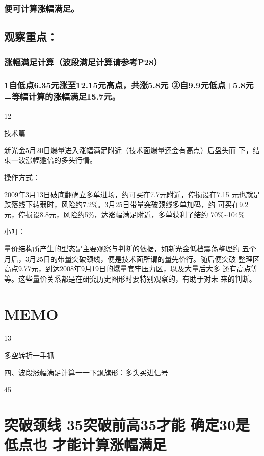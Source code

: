 \documentclass{article}
\begin{document}
\subsubsection{便可计算涨幅满足。}

\subsection{观察重点：}

\subsubsection{涨幅满足计算（波段满足计算请参考P28）}

\subsubsection{1自低点6.35元涨至12.15元高点，共涨5.8元 ②自9.9元低点+5.8元=等幅计算的涨幅满足15.7元。}

12

\clearpage

技术篇

新光金5月20日爆量进入涨幅满足附近（技术面爆量还会有高点）后盘头而 下，结束一波涨幅逾倍的多头行情。

操作方式：

2009年3月13日破底翻确立多单进场，约可买在7.7元附近，停损设在7.15 元也就是跌落线下转弱时，风险约7.2\%。3月25日带量突破颈线多单加码，约 可买在9.2元，停损设8.8元，风险约5\%，达涨幅满足附近，多单获利了结约 70\%\textasciitilde{}104\%

小叮：

量价结构所产生的型态是主要观察与判断的依据，如新光金低档震荡整理约 五个月后，3月25日的带量突破颈线，便是技术面所谓的量先价行。随后便突破 整理区高点9.77元，到达2008年9月19日的爆量套牢压力区，以及大量后大多 还有高点等等。这些量价关系都是在研究历史图形时要特别观察的，有助于对未 来的判断。

\section{MEMO}

13

\clearpage

多空转折一手抓

四、波段涨幅满足计算一一下飘旗形：多头买进信号

45

\section{突破颈线 35突破前高35才能 确定30是低点也 才能计算涨幅满足}
\end{document}
